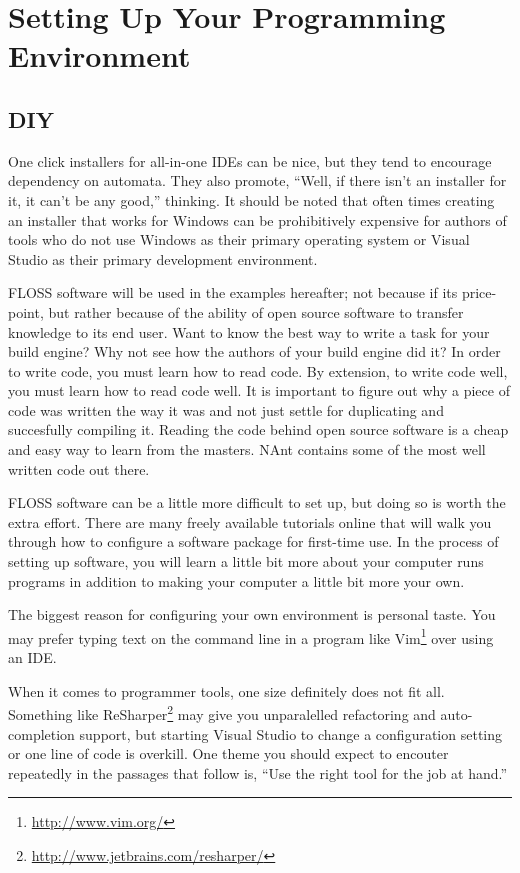 
\chapter{Setting Up Your Programming Environment}

\section{DIY}
One click installers for all-in-one \glspl{IDE} can be nice, but they tend to encourage dependency on automata. They also promote, ``Well, if there 
isn't an installer for it, it can't be any good,'' thinking. It should be noted that often times creating an installer that works for Windows can be
prohibitively expensive for authors of tools who do not use Windows as their primary operating system or Visual Studio as their primary development 
environment.

\gls{FLOSS} software will be used in the examples hereafter; not because if its price-point, but rather because of the ability of open source software
to transfer knowledge to its end user. Want to know the best way to write a task for your build engine? Why not see how the authors of your build
engine did it? In order to write code, you must learn how to read code. By extension, to write code well, you must learn how to read code well. It is 
important to figure out why a piece of code was written the way it was and not just settle for duplicating and succesfully compiling it. Reading the 
code behind open source software is a cheap and easy way to learn from the masters. \gls{NAnt} contains some of the most well written \CSharp code out there.

\gls{FLOSS} software can be a little more difficult to set up, but doing so is worth the extra effort. There are many freely available tutorials
online that will walk you through how to configure a software package for first-time use. In the process of setting up software, you will learn a
little bit more about your computer runs programs in addition to making your computer a little bit more your own.

The biggest reason for configuring your own environment is personal taste. You may prefer typing text on the command line in a program like 
Vim\footnote{\url{http://www.vim.org/}} over using an \gls{IDE}.

When it comes to programmer tools, one size definitely does not fit all. Something like ReSharper\footnote{\url{http://www.jetbrains.com/resharper/}} 
may give you unparalelled \gls{refactoring} and \gls{auto-completion} support, but starting Visual Studio to change a configuration setting or one 
line of code is overkill. One theme you should expect to encouter repeatedly in the passages that follow is, 
``Use the right tool for the job at hand.''

